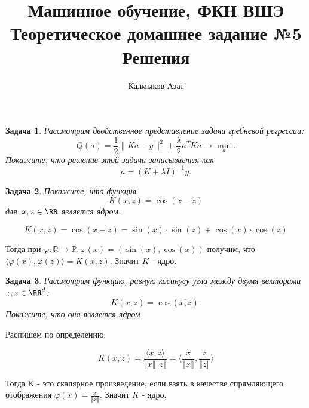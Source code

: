 \documentclass[12pt,fleqn]{article}
\title{Машинное обучение, ФКН ВШЭ\\Теоретическое домашнее задание №5\\Решения}
\author{Калмыков Азат}
\date{}
\newtheorem{esProblem}{Задача}
\begin{document}
\maketitle

\begin{esProblem}
    Рассмотрим двойственное представление задачи гребневой регрессии:
    \[
        Q(a)
        =
        \frac{1}{2} \| K a - y \|^2 + \frac{\lambda}{2} a^T K a \to \min_a.
    \]
    Покажите, что решение этой задачи записывается как
    \[
        a = (K + \lambda I)^{-1} y.
    \]
\end{esProblem}
\begin{esSolution}

\end{esSolution}

\begin{esProblem}
    Покажите, что функция
    \[
        K(x, z) = \cos(x - z)
    \]
    для~$x, z \in \RR$ является ядром.
\end{esProblem}
\begin{esSolution}
    \begin{equation*}
        K(x, z) = \cos(x-z) = \sin(x) \cdot \sin(z) + \cos(x) \cdot \cos(z)
    \end{equation*}

    Тогда при $\varphi\colon \mathbb{R} \to \mathbb{R}, \varphi(x) = (\sin(x), \cos(x))$ получим, что $\langle \varphi(x), \varphi(z) \rangle = K(x, z)$. Значит $K$ - ядро.
\end{esSolution}

\begin{esProblem}
    Рассмотрим функцию, равную косинусу угла между двумя векторами~$x, z \in \RR^d$:
    \[
        K(x, z) = \cos(\widehat{x, z}).
    \]
    Покажите, что она является ядром.
\end{esProblem}
\begin{esSolution}
    Распишем по определению: 
    
    \begin{equation*}
        K(x, z) = \frac{\langle x, z \rangle}{\left\Vert x \right\Vert\left\Vert z \right\Vert} = \langle \frac{x}{\left\Vert x \right\Vert}, \frac{z}{\left\Vert z \right\Vert} \rangle
    \end{equation*}
    
    Тогда K - это скалярное произведение, если взять в качестве спрямляющего отображения $\varphi(x) = \frac{x}{\left\Vert x \right\Vert}$. Значит $K$ - ядро.
\end{esSolution}
\end{document}
